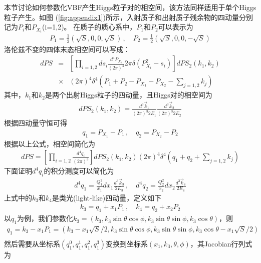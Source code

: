 本节讨论如何参数化VBF产生Higgs粒子对的相空间，该方法同样适用于单个Higgs粒子产生。如图
(\ref{fig:appendix1})所示，入射质子和出射质子残余物的四动量分别记为$P_i$和$P_{X_i}$(i=1,2)。
在质子的质心系中，$P_1$和$P_2$可以表示为
\begin{eqnarray}
P_1 = \frac{1}{2}(\sqrt{S}, 0, 0, \sqrt{S})\,, \quad P_2 = \frac{1}{2}(\sqrt{S}, 0, 0, -\sqrt{S})
\end{eqnarray}
洛伦兹不变的四体末态相空间可以写成：
\begin{eqnarray}
d PS &=&
\left[
\prod_{i=1,2}
d s_i \frac{d^4 P_{X_i}}{\left( 2 \pi \right)^4} 2 \pi \delta \left( P_{X_i}^2 -s_i \right)
\right]
d PS_2(k_1, k_2) 
\nonumber \\
&\times& 
\left( 2 \pi \right)^4 \delta^4 \left( P_1 + P_2 - P_{X_1} - P_{X_2} - \sum_{j=1,2} k_j \right)
\end{eqnarray}
其中，$k_1$和$k_2$是两个出射Higgs粒子的四动量，且Higgs对的相空间为
\begin{eqnarray}
d PS_2(k_1, k_2) =
\frac{d^3 \vec{k}_1}{\left( 2 \pi \right)^3 2 E_1}
\frac{d^3 \vec{k}_2}{\left( 2 \pi \right)^3 2 E_2}
\end{eqnarray}
根据四动量守恒可得
\begin{eqnarray}
q_1 = P_{X_1} - P_1\,, \quad q_2 = P_{X_2} - P_2
\end{eqnarray}
根据以上公式，相空间简化为
\begin{eqnarray}
d PS =
\left[
\prod_{i=1,2}
\frac{d^4 q_i}{\left( 2 \pi \right)^3}
\right]
d PS_2(k_1, k_2)
\left( 2 \pi \right)^4 \delta^4 \left( q_1 + q_2 + \sum_{j=1,2} k_j \right)
\end{eqnarray}
下面证明$d^4q_i$的积分测度可以简化为
\begin{eqnarray}
d^4 q_1 = \frac{Q_1^2}{x_1} d x_1 \frac{d^3 \vec{k}_3}{2 E_3}\,, \quad
d^4 q_2 = \frac{Q_2^2}{x_2} d x_2 \frac{d^3 \vec{k}_4}{2 E_4}
\label{eqn:IntegralMeasure}
\end{eqnarray}
上式中的$k_3$和$k_4$是类光(light-like)四动量，定义如下
\begin{eqnarray}
k_3 = q_1 + x_1 P_1\,,\quad
k_4 = q_2 + x_2 P_2
\end{eqnarray}
以$q_1$为例，我们参数化$k_3 = (k_3, k_3\sin\theta\cos\phi, k_3\sin\theta\sin\phi, k_3\cos\theta)$，则
\begin{eqnarray}
q_1 = k_3 - x_1P_1 = (k_3 -x_1\sqrt{S}/2, k_3\sin\theta\cos\phi, k_3\sin\theta\sin\phi,
k_3\cos\theta - x_1\sqrt{S}/2)
\nonumber \\
\end{eqnarray}
然后需要从坐标系$(q^0_1, q^1_1, q^2_1, q^3_1)$变换到坐标系$(x_1, k_3, \theta, \phi)$，其Jacobian行列式为
